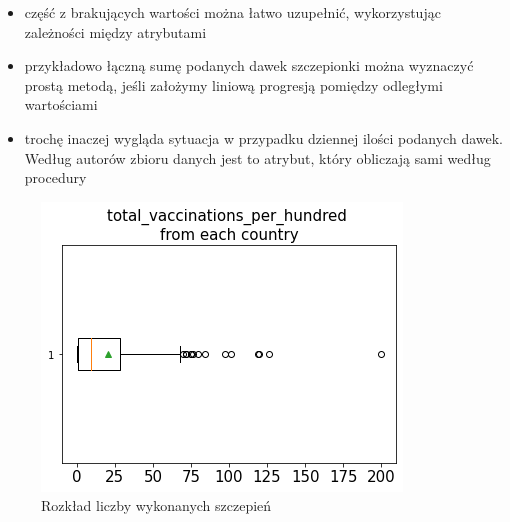 \documentclass[11pt]{beamer}
\begin{document}

\begin{frame}
\begin{itemize}
	\item część z brakujących wartości można łatwo uzupełnić, wykorzystując zależności między atrybutami
	\item przykładowo łączną sumę podanych dawek szczepionki można wyznaczyć prostą metodą, jeśli założymy liniową progresją pomiędzy odległymi wartościami
	\item trochę inaczej wygląda sytuacja w przypadku dziennej ilości podanych dawek. Według autorów zbioru danych jest to atrybut, który obliczają sami według procedury
	\begin{itemize}
	\end{itemize}
\end{itemize}
\end{frame}


\begin{frame}
\begin{figure}[!ht]
\centering
\includegraphics[scale=0.5]{../img/box_total_vaccinations.png} 
\caption{Rozkład liczby wykonanych szczepień}
\label{Rys:boxTotalVacc}
\end{figure}
\end{frame}
\end{document}
